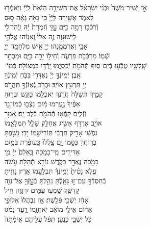 \documentclass[twoside, openany, parskip=half, 11pt]{book}
\begin{document}
אָ֣ז \hfill
יָֽשִׁיר־מֹשֶׁה֩ \hfill וּבְנֵ֨י \hfill יִשְׂרָאֵ֜ל \hfill אֶת־הַשִּׁירָ֤ה \hfill הַזֹּאת֙ \hfill לַֽיְֿיָ֔ \hfill וַיֹּֽאמְֿר֖וּ \\
לֵאמֹ֑ר \hfill אָשִׁ֤ירָה לַּֽיְֿיָ֙ כִּֽי־גָאֹ֣ה גָּאָ֔ה \hfill ס֥וּס \\
וְֿרֹֽכְֿב֖וֹ רָמָ֥ה בַיָּֽם׃ \hfill עׇׇׇָזִּ֤י וְֿזִמְרָת֙ יָ֔הּ וַֽיְֿהִי־לִ֖י \\
לִֽישׁוּעָ֑ה \hfill זֶ֤ה אֵלִי֙ ֽוְאַנְוֵ֔הוּ \hfill אֱלֹהֵ֥י \\
אָבִ֖י וַאֲרֹֽמֲמֶֽנְהוּ׃ \hfill יְיָ֖ אִ֣ישׁ מִלְחָמָ֑ה יְיָ֖ \\
שְֿׁמֽוֹ׃ \hfill מַרְכְּֿבֹ֥ת פַּרְעֹ֛ה וְֿחֵיל֖וֹ יָרָ֣ה בַיָּ֑ם \hfill וּמִבְחַ֥ר\\
שָֽׁלִשָׁ֖יו טֻבְֹּֿע֥וּ בְֿיַם־סֽוּף׃ \hfill תְּֿהֹמֹ֖ת יְֿכַסְיֻ֑מוּ יָֽרְֿד֥וּ בִמְצוֹלֹ֖ת כְּֿמוֹ־\\
אָֽבֶן׃ \hfill יְֿמִֽינְֿךָ֣ יְיָ֔ נֶאְדָּרִ֖י בַּכֹּ֑חַ \hfill יְֿמִֽינְֿךָ֥ \\
יְיָ֖ תִּרְעַ֥ץ אוֹיֵֽב׃ \hfill וּבְרֹ֥ב גְּֿאֽוֹנְֿךָ֖ תַּֽהֲרֹ֣ס \\
קָמֶ֑יךָ \hfill תְּֿשַׁלַּח֙ חֲרֹ֣נְֿךָ יֹֽאכְֿלֵ֖מוֹ כַּקַּֽשׁ׃ \hfill וּבְר֤וּחַ \\
אַפֶּ֨יךָ֙ נֶ֣עֶרְמוּ מַ֔יִם \hfill נִצְּֿב֥וּ כְֿמוֹ־נֵ֖ד \\
נֹֽזְֿלִ֑ים \hfill קָֽפְֿא֥וּ תְֿהֹמֹ֖ת בְּֿלֶב־יָֽם׃ \hfill אָמַ֥ר \\
אוֹיֵ֛ב אֶרְדֹּ֥ף אַשִּׂ֖יג \hfill אֲחַלֵּ֣ק שָׁלָ֑ל תִּמְלָאֵ֣מוֹ \\
נַפְשִׁ֔י \hfill אָרִ֣יק חַרְבִּ֔י תּֽוֹרִישֵׁ֖מוֹ יָדִֽי׃ \hfill נָשַׁ֥פְתָּ \\
בְֿרֽוּחֲךָ֖ כִּסָּ֣מוֹ יָ֑ם \hfill צָֽלֲלוּ֙ כַּֽעוֹפֶ֔רֶת בְּֿמַ֖יִם \\
אַדִּירִֽים׃ \hfill מִֽי־כָמֹ֤כָה בָּֽאֵלִם֙ יְיָ֔ \hfill מִ֥י \\
כָּמֹ֖כָה נֶאְדָּ֣ר בַּקֹּ֑דֶשׁ \hfill נוֹרָ֥א תְֿהִלֹּ֖ת עֹ֥שֵׂה \\
פֶֽלֶא׃ \hfill נָטִ֨יתָ֙ יְֿמִ֣ינְֿךָ֔ תִּבְלָעֵ֖מוֹ אָֽרֶץ׃ \hfill נָחִ֥יתָ \\
בְֿחַסְדְּֿךָ֖ עַם־ז֣וּ גָּאָ֑לְֿתָּ \hfill נֵהַ֥לְתָּ בְֿעׇׇׇׇׇָזְּֿךָ֖ אֶל־נְוֵ֥ה \\
קָדְֿשֶֽׁךָ׃ \hfill שָֽׁמְֿע֥וּ עַמִּ֖ים יִרְגָּז֑וּן \hfill חִ֣יל \\
אָחַ֔ז יֹֽשְֿׁבֵ֖י פְּֿלָֽשֶׁת׃ \hfill אָ֤ז נִבְהֲלוּ֙ אַלּוּפֵ֣י \\
אֱד֔וֹם \hfill אֵילֵ֣י מוֹאָ֔ב יֹֽאחֲזֵ֖מוֹ רָ֑עַד \hfill נָמֹ֕גוּ\\
כֹּ֖ל יֹֽשְֿׁבֵ֥י כְֿנָֽעַן׃ \hfill תִּפֹּ֨ל עֲלֵיהֶ֤ם אֵימָ֨תָה֙ \\
\end{document}
